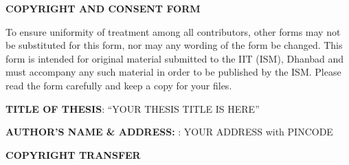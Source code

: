 
\begin{center}
    {\textbf{\color{red}\large COPYRIGHT AND CONSENT FORM}}
\end{center}

\setlength{\parskip}{1em} %

\noindent
\justifying

To ensure uniformity of treatment among all contributors, other forms may not be substituted for this form, nor may any wording of the form be changed. This form is intended for original material submitted to the IIT (ISM), Dhanbad and must accompany any such material in order to be published by the ISM. Please read the form carefully and keep a copy for your files.\par

\vspace{0.3cm}
\noindent
\textbf{TITLE OF THESIS}: “YOUR THESIS TITLE IS HERE”\par

\vspace{0.3cm}
\noindent
\textbf{AUTHOR'S NAME \& ADDRESS: }: YOUR ADDRESS with PINCODE 

\begin{center}
    \textbf{COPYRIGHT TRANSFER}
\end{center}

